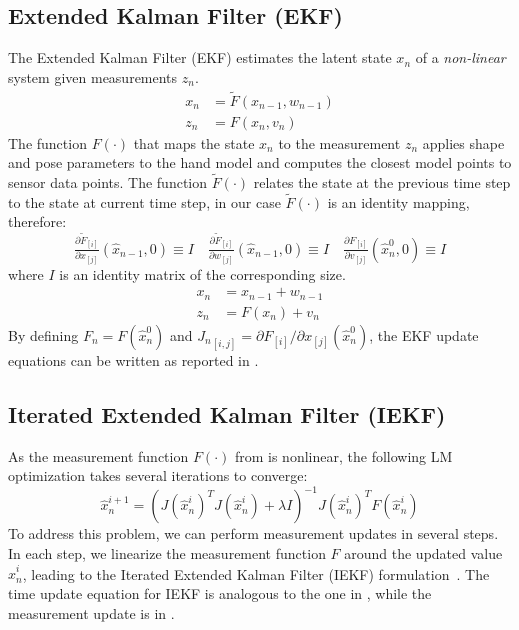\subsection{Extended Kalman Filter (EKF)}
\label{app:ekf}
The Extended Kalman Filter (EKF) estimates the latent state $x_n$ of a \emph{non-linear} system given measurements $z_n$.
% 
\begin{align}
x_n &= \tilde{F}(x_{n - 1},  w_{n - 1}) \\
z_n &= F(x_n, v_n)
\end{align}
% 
The function $F(\cdot)$ that maps the state $x_n$ to the measurement $z_n$ applies shape and pose parameters to the hand model and computes the closest model points to sensor data points. 
The function $\tilde{F}(\cdot)$ relates the state at the previous time step to the state at current time step, in our case $\tilde{F}(\cdot)$ is an identity mapping, therefore:
\begin{equation*}
\tfrac{ \partial \tilde{F}_{[i]}}{ \partial x_{[j]}}(\hat{x}_{n - 1}, 0) \equiv I
\quad
\tfrac{ \partial \tilde{F}_{[i]}}{ \partial w_{[j]}}(\hat{x}_{n - 1}, 0) \equiv I
\quad
\tfrac{ \partial F_{[i]}}{ \partial v_{[j]}}(\hat{x}_n^0, 0) \equiv I
\end{equation*}
% 
where $I$ is an identity matrix of the corresponding size.
% 
% 
\begin{align}
x_n &= x_{n - 1} + w_{n - 1} \\
z_n &= F(x_n) + v_n 
\end{align}
%
By defining $F_n = F(\hat{x}_n^0)$ and ${J_n}_{[i, j]} = \partial F_{[i]} / \partial x_{[j]}(\hat{x}_n^0)$, the EKF update equations can be written as reported in .
%



\subsection{Iterated Extended Kalman Filter (IEKF)}
\label{app:iekf}
As the measurement function $F(\cdot)$ from  is nonlinear, the following LM optimization takes several iterations to converge: 
% 
\begin{equation}
\hat{x}_n^{i + 1} = (J(\hat{x}_n^i) ^T J(\hat{x}_n^i) + \lambda I)^{-1} J(\hat{x}_n^i)^T F(\hat{x}_n^i)   
\end{equation}
% 
To address this problem, we can perform measurement updates in several steps. In each step, we linearize the measurement function $F$ around the updated value $\hat{x}_n^i$, leading to the Iterated Extended Kalman Filter (IEKF) formulation~\cite{havlik2015performance}. The time update equation for IEKF is analogous to the one in , while the measurement update is in . 






 
